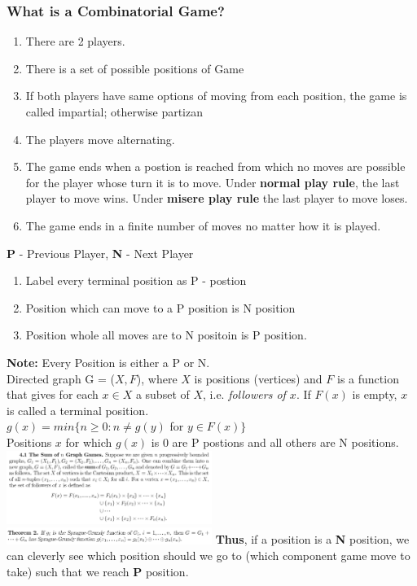 \documentclass[8pt, a4paper, oneside, twocolumn]{extarticle}
\begin{document}
\subsubsection{What is a Combinatorial Game?}
\begin{enumerate}
\item There are 2 players.
\item There is a set of possible positions of Game
\item If both players have same options of moving from each position, the game is called impartial; otherwise partizan
\item The players move alternating.
\item The game ends when a postion is reached from which no moves are possible for the player whose turn it is to move. Under \textbf {normal play rule}, the last player to move wins. Under \textbf {misere play rule} the last player to move loses.
\item The game ends in a finite number of moves no matter how it is played.
\end{enumerate}
\textbf{P} - Previous Player, \textbf{N} - Next Player
\begin{enumerate}
\item Label every terminal position as P - postion
\item Position which can move to a P position is N position
\item Position whole all moves are to N positoin is P position.
\end{enumerate}
\textbf{Note: } Every Position is either a P or N. \\
Directed graph G = ($X, F$), where $X$ is positions (vertices) and $F$ is a function that gives for each $x \in X$ a subset of $X$, i.e. \textit {followers of $x$}. If $F (x)$ is empty, $x$ is called a terminal position.\\
$g(x) = min \{ n \geq 0 : n \neq g (y)$ for $y \in F (x)\}$\\
Positions $x$ for which $g(x)$ is 0 are P postions and all others are N positions.\\
\includegraphics[width=0.5\textwidth,height=0.5\textheight,keepaspectratio]{sumgraph}
\includegraphics[width=0.5\textwidth,height=0.5\textheight,keepaspectratio]{sgth}
\textbf{Thus}, if a position is a \textbf{N} position, we can cleverly see which position should we go to (which component game move to take) such that we reach \textbf {P} position.
\end{document}
